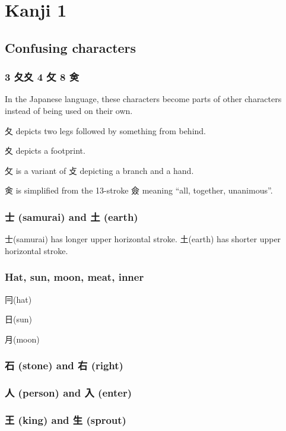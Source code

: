\chapter{Kanji 1}

\section{Confusing characters}

\subsection{3 夂夊 4 攵 8 㑒}

In the Japanese language,
these characters become parts of other characters
instead of being used on their own.

夂 depicts two legs followed by something from behind.

夊 depicts a footprint.

攵 is a variant of 攴 depicting a branch and a hand.

㑒 is simplified from the 13-stroke 僉
meaning ``all, together, unanimous''.

\subsection{士 (samurai) and 土 (earth)}

士(samurai) has longer upper horizontal stroke.
土(earth) has shorter upper horizontal stroke.

\subsection{Hat, sun, moon, meat, inner}

冃(hat)

日(sun)

月(moon)

\subsection{石 (stone) and 右 (right)}

\subsection{人 (person) and 入 (enter)}

\subsection{王 (king) and 生 (sprout)}

